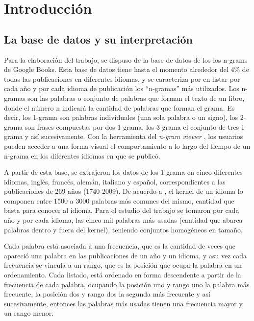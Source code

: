 

\chapter{Introducción}


\section{La base de datos y su interpretación} %

Para la elaboración del trabajo,  se dispuso de la base de datos de los los n-grams de Google Books. Esta base de datos tiene hasta el momento alrededor del 4$\%$ de todas las publicaciones en diferentes idiomas,  y se caracteriza por en listar  por cada año y por cada idioma de publicación los “n-gramas” más utilizados.   Los n-gramas son las palabras o conjunto de palabras que forman el texto de un libro, donde el número n indicará la cantidad de palabras que forman el grama.  Es decir, los  1-grama son palabras individuales (una sola palabra o un signo), los 2-grama son frases compuestas por dos 1-grama, los 3-grama el conjunto de tres 1-grama y así sucesivamente.   Con la herramienta del \textit{n-gram viewer} \cite{ngramv}, los usuarios pueden acceder a una forma visual el comportamiento a lo largo del tiempo de un n-grama en los diferentes idiomas en que se publicó.  

A partir de esta base, se extrajeron los datos de los 1-grama en cinco diferentes idiomas, inglés, francés, alemán, italiano y español, correspondientes a las publicaciones de 269 años (1740-2009).  De acuerdo a \cite{iplosone},  el kernel de un idioma lo componen entre 1500 a 3000 palabras más comunes del mismo,  cantidad que basta para conocer al idioma.  Para el estudio del trabajo se tomaron por cada año y por cada idioma,  las cinco mil palabras más usadas (cantidad que abarca palabras dentro y fuera del kernel), teniendo conjuntos homogéneos en tamaño.

Cada palabra está asociada a una frecuencia, que es la cantidad de veces que apareció una palabra en las publicaciones de un año y un idioma, y asu vez cada frecuencia se vincula a un rango, que es la posición que ocupa la palabra en un ordenamiento.  Cada listado, está ordenado en forma descendente a partir de la frecuencia de cada palabra,  ocupando la posición uno y rango uno la palabra más frecuente, la posición dos y rango dos la segunda más frecuente y así sucesivamente, entonces las palabras más usadas tienen una frecuencia mayor y un rango menor. 

